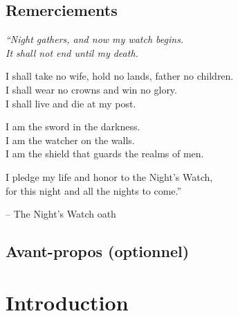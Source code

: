 \documentclass[pidr]{tnreport}
\begin{document}
  
\maketitle
{}


\cleardoublepage

\makesecondtitle

\section*{Remerciements}

{\em
``Night gathers, and now my watch begins. \\
It shall not end until my death.

I shall take no wife, hold no lands, father no children. \\
I shall wear no crowns and win no glory. \\
I shall live and die at my post.

I am the sword in the darkness. \\
I am the watcher on the walls. \\
I am the shield that guards the realms of men.

I pledge my life and honor to the Night's Watch, \\
for this night and all the nights to come.''
}

\hspace{4cm} -- The Night's Watch oath


\cleardoublepage

\section*{Avant-propos (optionnel)}


\cleardoublepage

\renewcommand{\baselinestretch}{0.5}\normalsize
\tableofcontents
\renewcommand{\baselinestretch}{1.0}\normalsize
\cleardoublepage

\setcounter{page}{1}

\chapter{Introduction}
\end{document}
